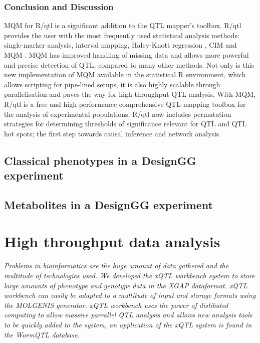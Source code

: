 \documentclass[8pt, twoside, a5paper]{report}
\begin{document}
\subsection{Conclusion and Discussion}
MQM for R/qtl is a significant addition to the QTL mapper's toolbox. R/qtl provides the user with the most frequently 
used statistical analysis methods: single-marker analysis, interval mapping, Haley-Knott regression \cite{Haley:1992}, 
CIM \cite{Zeng:1994} and MQM \cite{Jansen:1994a}.  MQM has improved handling of missing data and allows more powerful 
and precise detection of QTL, compared to many other methods. Not only is this new implementation of MQM available in the
statistical R environment, which allows scripting for pipe-lined setups, it is also highly scalable through 
parallelisation and paves the way for high-throughput QTL analysis. With MQM, R/qtl is a free and high-performance 
comprehensive QTL mapping toolbox for the analysis of experimental populations. R/qtl now includes permutation strategies 
for determining thresholds of significance relevant for QTL and QTL hot spots; the first step towards causal inference and
network analysis.

\section{Classical phenotypes in a DesignGG experiment}
\lipsum

\section{Metabolites in a DesignGG experiment}
\lipsum

\chapter{High throughput data analysis}

\emph{Problems in bioinformatics are the huge amount of data gathered and the multitude of technologies used. We 
developed the xQTL workbench system\cite{Arends:2012} to store large amounts of phenotype and genotype data 
in the XGAP\cite{Swertz:2010a} dataformat. xQTL workbench can easily be adapted to a multitude of input and 
storage formats using the MOLGENIS\cite{Swertz:2004} generator. xQTL workbench uses the power of distibuted 
computing to allow massive parrallel QTL analysis and allows new analysis tools to be quickly added to the 
system, an application of the xQTL system is found in the WormQTL database\cite{Snoek:2012}.}
\end{document}
